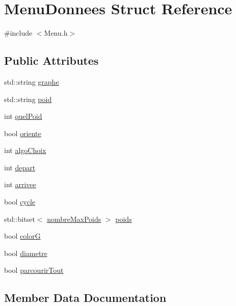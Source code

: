 \hypertarget{struct_menu_donnees}{}\section{Menu\+Donnees Struct Reference}
\label{struct_menu_donnees}


{\ttfamily \#include $<$Menu.\+h$>$}

\subsection*{Public Attributes}
\begin{DoxyCompactItemize}
\item 
std\+::string \mbox{\hyperlink{struct_menu_donnees_a50b1617a3d1d4acbe0e0943ed0bd8c85}{graphe}}
\item 
std\+::string \mbox{\hyperlink{struct_menu_donnees_ab6965a46bb5eb45820cb6148cfe1fc59}{poid}}
\item 
int \mbox{\hyperlink{struct_menu_donnees_aa2561120ada24f21a281f888005f086e}{quel\+Poid}}
\item 
bool \mbox{\hyperlink{struct_menu_donnees_a8772d877ced4cc5062de283fcb142740}{oriente}}
\item 
int \mbox{\hyperlink{struct_menu_donnees_ac26874f97726bdbd3b5572ac53b80b5f}{algo\+Choix}}
\item 
int \mbox{\hyperlink{struct_menu_donnees_ae3034ab7b7de61baae4a307a1bf6a72a}{depart}}
\item 
int \mbox{\hyperlink{struct_menu_donnees_a34e6e9f08547c4293bd988c2c8caaa5e}{arrivee}}
\item 
bool \mbox{\hyperlink{struct_menu_donnees_a61e5018cd2ea1778a413e9d5ec073b56}{cycle}}
\item 
std\+::bitset$<$ \mbox{\hyperlink{libraries_8h_ad73c201205ac3bfe4a118d327a7255ce}{nombre\+Max\+Poids}} $>$ \mbox{\hyperlink{struct_menu_donnees_a4ed6d7392ed72cfdcf8efb68018b5873}{poids}}
\item 
bool \mbox{\hyperlink{struct_menu_donnees_a1142c175e133959b15a3e04ea78f727b}{colorG}}
\item 
bool \mbox{\hyperlink{struct_menu_donnees_ae3e64467c62fbc8e7eb97ce87aee0924}{diametre}}
\item 
bool \mbox{\hyperlink{struct_menu_donnees_a32a58b38d2cbfe35df1f4b6386ba04b3}{parcourir\+Tout}}
\end{DoxyCompactItemize}


\subsection{Member Data Documentation}
\mbox{\label{struct_menu_donnees_ac26874f97726bdbd3b5572ac53b80b5f}} 

